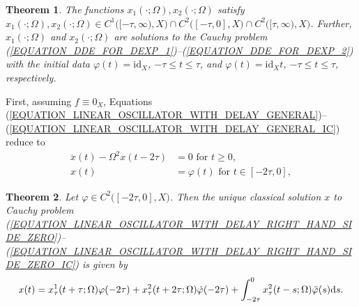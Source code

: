\documentclass[12pt]{article}
\newtheorem{theorem}{Theorem}[section]
\numberwithin{equation}{section}
\numberwithin{equation}{section}
\begin{document}
	\begin{theorem}
		The functions $x_{1}(\cdot; \Omega), x_{2}(\cdot; \Omega)$ satisfy
		$x_{1}(\cdot; \Omega), x_{2}(\cdot; \Omega) \in C^{1}\big([-\tau, \infty), X\big) \cap C^{2}\big([-\tau, 0], X) \cap C^{2}\big([\tau, \infty), X\big)$.
		Further, $x_{1}(\cdot; \Omega)$ and $x_{2}(\cdot; \Omega)$ are solutions to the Cauchy problem (\ref{EQUATION_DDE_FOR_DEXP_1})--(\ref{EQUATION_DDE_FOR_DEXP_2})
		with the initial data
		$\varphi(t) = \mathrm{id}_{X}$, $-\tau \leq t \leq \tau$, and
		$\varphi(t) = \mathrm{id}_{X} t$, $-\tau \leq t \leq \tau$, respectively.
	\end{theorem}

	First, assuming $f \equiv 0_{X}$, Equations (\ref{EQUATION_LINEAR_OSCILLATOR_WITH_DELAY_GENERAL})--(\ref{EQUATION_LINEAR_OSCILLATOR_WITH_DELAY_GENERAL_IC})
	reduce to
	\begin{align}
		\ddot{x}(t) - \Omega^{2} x(t - 2\tau) &= 0 \text{ for } t \geq 0 \label{EQUATION_LINEAR_OSCILLATOR_WITH_DELAY_RIGHT_HAND_SIDE_ZERO}, \\
		x(t) &= \varphi(t) \text{ for } t \in [-2\tau, 0], \label{EQUATION_LINEAR_OSCILLATOR_WITH_DELAY_RIGHT_HAND_SIDE_ZERO_IC}
	\end{align}

	\begin{theorem}
		\label{THEOREM_SOLUTION_RIGHT_HAND_SIDE_ZERO}
		Let $\varphi \in C^{2}\big([-2\tau, 0], X\big)$.
		Then the unique classical solution $x$ to Cauchy problem (\ref{EQUATION_LINEAR_OSCILLATOR_WITH_DELAY_RIGHT_HAND_SIDE_ZERO})--(\ref{EQUATION_LINEAR_OSCILLATOR_WITH_DELAY_RIGHT_HAND_SIDE_ZERO_IC}) is given by
		\begin{equation}
			x(t) = x^{1}_{\tau}(t + \tau; \Omega) \varphi(-2\tau) + x^{2}_{\tau}(t + 2\tau; \Omega) \dot{\varphi}(-2\tau) +
			\int_{-2\tau}^{0} x^{2}_{\tau}(t - s; \Omega) \ddot{\varphi}(s) \mathrm{d}s. \notag
		\end{equation}
	\end{theorem}
\end{document}
